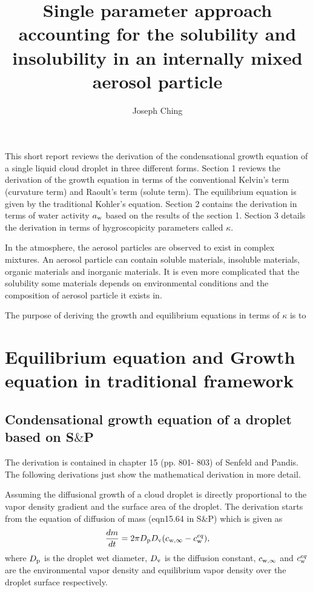 \documentclass[12pt]{article}
\title{Single parameter approach accounting for the solubility and insolubility in an internally mixed aerosol particle}
\author{Joseph Ching}
\begin{document}
\maketitle
\tableofcontents


This short report reviews the derivation of the condensational growth equation of a single liquid cloud droplet in three different forms. Section 1 reviews the derivation of the growth equation in terms of the conventional Kelvin's term (curvature term) and Raoult's term (solute term). The equilibrium equation is given by the traditional Kohler's equation. Section 2 contains the derivation in terms of water activity $a_{\rm w}$ based on the results of the section 1. Section 3 details the derivation in terms of hygroscopicity parameters called $\kappa$. 

In the atmosphere, the aerosol particles are observed to exist in complex mixtures. An aerosol particle can contain  soluble materials,  insoluble materials, organic materials and inorganic materials. It is even more complicated that the solubility some materials depends on environmental conditions and the composition of aerosol particle it exists in. 

The purpose of deriving the growth and equilibrium equations in terms of $\kappa$ is to 

\section{Equilibrium equation and Growth equation in traditional framework}

\subsection{Condensational growth equation of a droplet based on S$\&$P}

The derivation is contained in chapter 15 (pp. 801- 803) of Senfeld and Pandis. The following derivations just show the mathematical derivation in more detail.

Assuming the diffusional growth of a cloud droplet is directly proportional to the vapor density gradient and the surface area of the droplet. The derivation starts from the equation of diffusion of mass (eqn15.64 in S$\&$P) which is given as
\begin{equation}\label{eqn:SP1}
\frac{dm}{dt}=2 \pi D_{\rm p} D_{\rm v} (c_{\rm w, \infty} - c_{\rm w}^{eq}),  
\end{equation}
where $D_{\rm p}$ is the droplet wet diameter, $D_{\rm v}$ is the diffusion constant, $c_{\rm w, \infty}$ and $c^{eq}_{\rm w}$ are the environmental vapor density and equilibrium vapor density over the droplet surface respectively.
\end{document}

